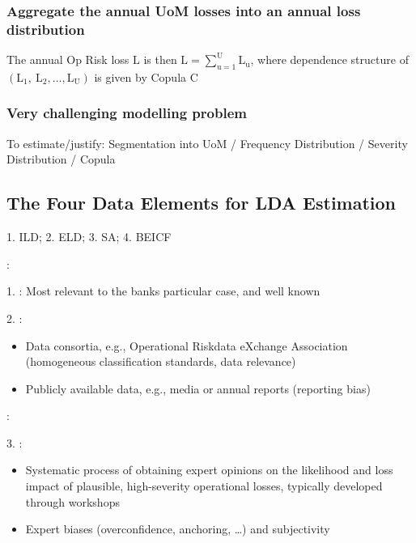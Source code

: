 \subsubsection*{Aggregate the annual UoM losses into an annual loss distribution}
The annual Op Risk loss $\mathrm{L}$ is then $\mathrm{L}=\sum_{\mathrm{u}=1}^{\mathrm{U}} \mathrm{L}_{\mathrm{u}}$, where dependence structure of $\left(\mathrm{L}_{1}, \mathrm{~L}_{2}, \ldots, \mathrm{L}_{\mathrm{U}}\right)$ is given by Copula C
\subsubsection*{Very challenging modelling problem}
To estimate/justify: Segmentation into UoM / Frequency Distribution / Severity Distribution / Copula






\subsection*{The Four Data Elements for LDA Estimation}
1. ILD; 2. ELD; 3. SA; 4. BEICF

:

1. : Most relevant to the banks particular
case, and well known

2. :
\begin{itemize}[leftmargin=*]
    \item Data consortia, e.g., Operational Riskdata
eXchange Association (homogeneous
classification standards, data relevance)
    \item Publicly available data, e.g., media or
annual reports (reporting bias)
\end{itemize}



:

3. :
\begin{itemize}[leftmargin=*]
    \item Systematic process of obtaining expert opinions on the
likelihood and loss impact of plausible, high-severity
operational losses, typically developed through
workshops
    \item Expert biases (overconfidence, anchoring, …) and
subjectivity
\end{itemize}


